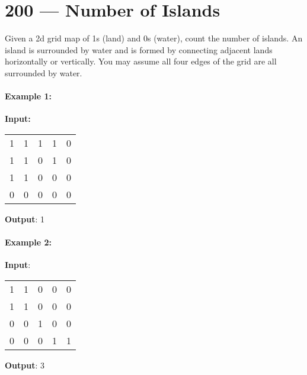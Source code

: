 \section{200 --- Number of Islands}
Given a 2d grid map of 1s (land) and 0s (water), count the number of islands. An island is surrounded by water and is formed by connecting adjacent lands horizontally or vertically. You may assume all four edges of the grid are all surrounded by water.
\paragraph{Example 1:}
\begin{flushleft}
\textbf{Input:}
\begin{table}[H]
\begin{tabular}{lllll}
1 & 1 & 1 & 1 & 0 \\
1 & 1 & 0 & 1 & 0 \\
1 & 1 & 0 & 0 & 0 \\
0 & 0 & 0 & 0 & 0
\end{tabular}
\end{table}
\textbf{Output}: 1
\end{flushleft}
\paragraph{Example 2:}
\begin{flushleft}
\textbf{Input}:
\begin{table}[H]
\begin{tabular}{lllll}
1 & 1 & 0 & 0 & 0 \\
1 & 1 & 0 & 0 & 0 \\
0 & 0 & 1 & 0 & 0 \\
0 & 0 & 0 & 1 & 1
\end{tabular}
\end{table}
\textbf{Output}: 3
\end{flushleft}
